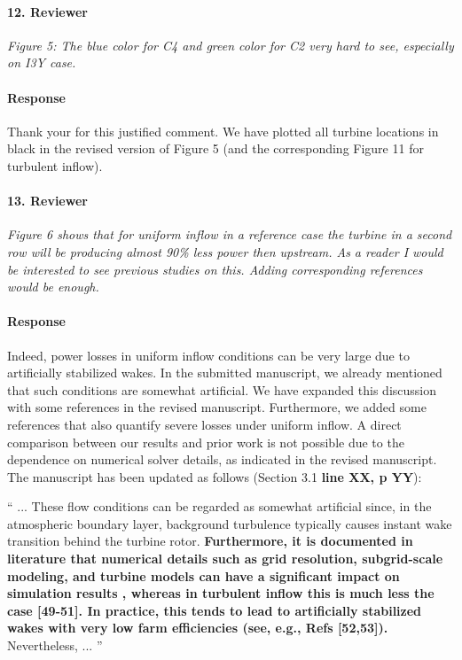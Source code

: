 \documentclass[]{article}
\newcommand{\red}[1]{\textbf{\color{red} #1}}
\newcommand{\revision}[1]{\textbf{#1}}
\begin{document}
\hrulefill

\paragraph{12. Reviewer} \textit{Figure 5: The blue color for C4 and green color for C2 very hard to see, especially on I3Y case.}

\paragraph{Response} Thank your for this justified comment. We have plotted all turbine locations in black in the revised version of Figure 5 (and the corresponding Figure 11 for turbulent inflow).

\hrulefill

\paragraph{13. Reviewer} \textit{Figure 6 shows that for uniform inflow in a reference case the turbine in a second row will be producing almost 90\% less power then upstream. As a reader I would be interested to see previous studies on this. Adding corresponding references would be enough.}

\paragraph{Response} Indeed, power losses in uniform inflow conditions can be very large due to artificially stabilized wakes. In the submitted manuscript, we already mentioned that such conditions are somewhat artificial. We have expanded this discussion with some references in the revised manuscript. Furthermore, we added some references that also quantify severe losses under uniform inflow. A direct comparison between our results and prior work is not possible due to the dependence on numerical solver details, as indicated in the revised manuscript. The manuscript has been updated as follows (Section 3.1 \red{line XX, p YY}):

``
... These flow conditions can be regarded as somewhat artificial since, in the atmospheric boundary layer, background turbulence typically causes instant wake transition behind the turbine rotor. \revision{Furthermore, it is documented in literature that numerical details such as grid resolution, subgrid-scale modeling, and turbine models can have a significant impact on simulation results , whereas in turbulent inflow this is much less the case  [49-51]. In practice, this tends to lead to artificially stabilized wakes with very low farm efficiencies (see, e.g., Refs [52,53]).} Nevertheless, ...
''
\end{document}
